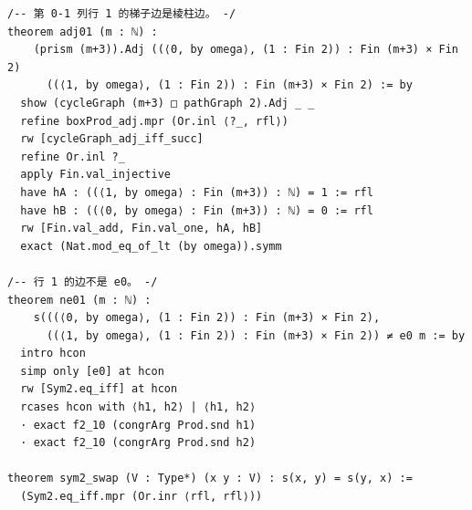 \documentclass[11pt]{article}
\begin{document}
\begin{lstlisting}
/-- 第 0-1 列行 1 的梯子边是棱柱边。 -/
theorem adj01 (m : ℕ) :
    (prism (m+3)).Adj ((⟨0, by omega⟩, (1 : Fin 2)) : Fin (m+3) × Fin 2)
      ((⟨1, by omega⟩, (1 : Fin 2)) : Fin (m+3) × Fin 2) := by
  show (cycleGraph (m+3) □ pathGraph 2).Adj _ _
  refine boxProd_adj.mpr (Or.inl ⟨?_, rfl⟩)
  rw [cycleGraph_adj_iff_succ]
  refine Or.inl ?_
  apply Fin.val_injective
  have hA : ((⟨1, by omega⟩ : Fin (m+3)) : ℕ) = 1 := rfl
  have hB : ((⟨0, by omega⟩ : Fin (m+3)) : ℕ) = 0 := rfl
  rw [Fin.val_add, Fin.val_one, hA, hB]
  exact (Nat.mod_eq_of_lt (by omega)).symm

/-- 行 1 的边不是 e0。 -/
theorem ne01 (m : ℕ) :
    s(((⟨0, by omega⟩, (1 : Fin 2)) : Fin (m+3) × Fin 2),
      ((⟨1, by omega⟩, (1 : Fin 2)) : Fin (m+3) × Fin 2)) ≠ e0 m := by
  intro hcon
  simp only [e0] at hcon
  rw [Sym2.eq_iff] at hcon
  rcases hcon with ⟨h1, h2⟩ | ⟨h1, h2⟩
  · exact f2_10 (congrArg Prod.snd h1)
  · exact f2_10 (congrArg Prod.snd h2)

theorem sym2_swap (V : Type*) (x y : V) : s(x, y) = s(y, x) :=
  (Sym2.eq_iff.mpr (Or.inr ⟨rfl, rfl⟩))


\end{lstlisting}
\end{document}
